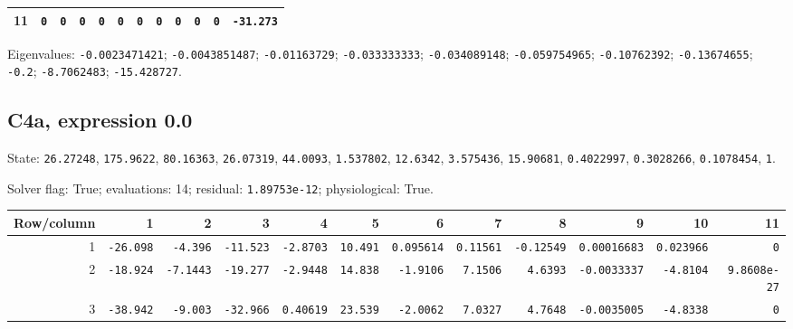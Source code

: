 \begin{landscape}
\begin{tabular}{rrrrrrrrrrrr}
11 & \texttt{0} & \texttt{0} & \texttt{0} & \texttt{0} & \texttt{0} & \texttt{0} & \texttt{0} & \texttt{0} & \texttt{0} & \texttt{0} & \texttt{-31.273} \\

\bottomrule\end{tabular}\par\endgroup

{\scriptsize Eigenvalues: \texttt{-0.0023471421}; \texttt{-0.0043851487}; \texttt{-0.01163729}; \texttt{-0.033333333}; \texttt{-0.034089148}; \texttt{-0.059754965}; \texttt{-0.10762392}; \texttt{-0.13674655}; \texttt{-0.2}; \texttt{-8.7062483}; \texttt{-15.428727}.\par}

\clearpage
\subsection*{C4a, expression 0.0}
{\scriptsize State: \texttt{26.27248}, \texttt{175.9622}, \texttt{80.16363}, \texttt{26.07319}, \texttt{44.0093}, \texttt{1.537802}, \texttt{12.6342}, \texttt{3.575436}, \texttt{15.90681}, \texttt{0.4022997}, \texttt{0.3028266}, \texttt{0.1078454}, \texttt{1}.\par

Solver flag: True; evaluations: 14; residual: \texttt{1.89753e-12}; physiological: True.\par}

\begingroup\scriptsize\setlength{\tabcolsep}{3pt}\centering
\begin{tabular}{rrrrrrrrrrrr}\toprule

Row/column & 1 & 2 & 3 & 4 & 5 & 6 & 7 & 8 & 9 & 10 & 11 \\ \midrule

1 & \texttt{-26.098} & \texttt{-4.396} & \texttt{-11.523} & \texttt{-2.8703} & \texttt{10.491} & \texttt{0.095614} & \texttt{0.11561} & \texttt{-0.12549} & \texttt{0.00016683} & \texttt{0.023966} & \texttt{0} \\

2 & \texttt{-18.924} & \texttt{-7.1443} & \texttt{-19.277} & \texttt{-2.9448} & \texttt{14.838} & \texttt{-1.9106} & \texttt{7.1506} & \texttt{4.6393} & \texttt{-0.0033337} & \texttt{-4.8104} & \texttt{9.8608e-27} \\

3 & \texttt{-38.942} & \texttt{-9.003} & \texttt{-32.966} & \texttt{0.40619} & \texttt{23.539} & \texttt{-2.0062} & \texttt{7.0327} & \texttt{4.7648} & \texttt{-0.0035005} & \texttt{-4.8338} & \texttt{0} \\


\end{tabular}
\end{landscape}
